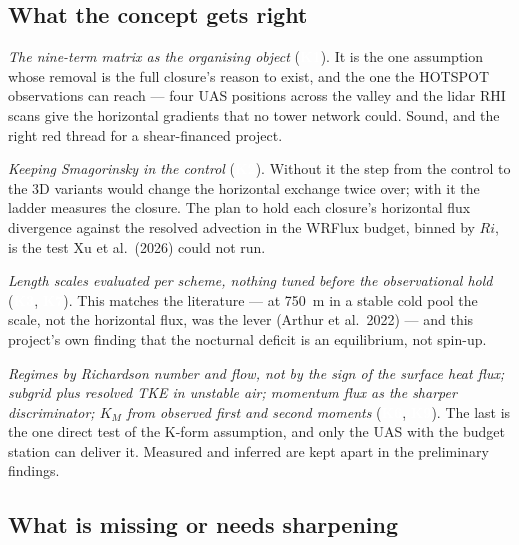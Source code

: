 \documentclass[10pt,a4paper]{article}
\newcommand{\keytag}[1]{\colorbox{keyc}{\textcolor{white}{\sffamily\bfseries\scriptsize K#1}}}
\begin{document}
\subsection{What the concept gets right}

\emph{The nine-term matrix as the organising object} (\keytag{1}). It is the one assumption whose removal is the full closure's reason to exist, and the one the HOTSPOT observations can reach — four UAS positions across the valley and the lidar RHI scans give the horizontal gradients that no tower network could. Sound, and the right red thread for a shear-financed project.

\emph{Keeping Smagorinsky in the control} (\keytag{2}). Without it the step from the control to the 3D variants would change the horizontal exchange twice over; with it the ladder measures the closure. The plan to hold each closure's horizontal flux divergence against the resolved advection in the WRFlux budget, binned by $Ri$, is the test Xu et al.\ (2026) could not run.

\emph{Length scales evaluated per scheme, nothing tuned before the observational hold} (\keytag{3}, \keytag{7}). This matches the literature — at 750~m in a stable cold pool the scale, not the horizontal flux, was the lever (Arthur et al.\ 2022) — and this project's own finding that the nocturnal deficit is an equilibrium, not spin-up.

\emph{Regimes by Richardson number and flow, not by the sign of the surface heat flux; subgrid plus resolved TKE in unstable air; momentum flux as the sharper discriminator; $K_M$ from observed first and second moments} (\keytag{6}, \keytag{9}). The last is the one direct test of the K-form assumption, and only the UAS with the budget station can deliver it. Measured and inferred are kept apart in the preliminary findings.

\subsection{What is missing or needs sharpening}
\end{document}
